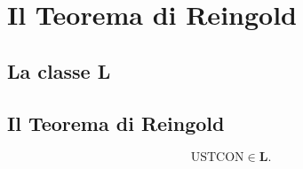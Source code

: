 \chapter{Il Teorema di Reingold}

\section{La classe \textbf{L}}

\section{Il Teorema di Reingold}
\begin{theorem}[Reingold] \label{thm:reingold}
	\[
		\textrm{USTCON} \in \textbf{L}.
	\]
\end{theorem}
